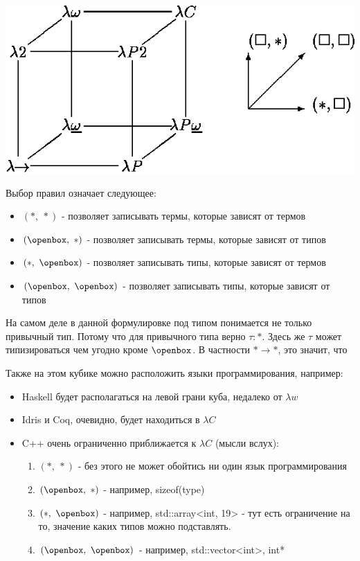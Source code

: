 \begin{center}
    {\includegraphics[scale=0.5]{pic.png}}
\end{center}

Выбор правил означает следующее:
\begin{itemize}
    \item $(*,\ *)$ - позволяет записывать термы, которые зависят от термов
    \item $(\openbox,\ *)$ - позволяет записывать термы, которые зависят от типов
    \item $(*,\ \openbox)$ - позволяет записывать типы, которые зависят от термов
    \item $(\openbox,\ \openbox)$ - позволяет записывать типы, которые зависят от типов
\end{itemize}

На самом деле в данной формулировке под типом понимается не только привычный тип. Потому что для привычного типа верно $\tau : *$. Здесь же $\tau$ может типизироваться чем угодно кроме $\openbox$. В частности $* \rightarrow *$, это значит, что 
    
Также на этом кубике можно расположить языки программирования, например:
\begin{itemize}
    \item Haskell будет располагаться на левой грани куба, недалеко от $\lambda w$
    \item Idris и Coq, очевидно, будет находиться в $\lambda C$
    \item C++ очень ограниченно приближается к $\lambda C$ (мысли вслух):
    \begin{enumerate}
        \item $(*,\ *)$ - без этого не может обойтись ни один язык программирования
        \item $(\openbox,\ *)$ - например, sizeof(type)
        \item $(*,\ \openbox)$ - например, std::array<int, 19> - тут есть ограничение на то, значение каких типов можно подставлять.
        \item $(\openbox,\ \openbox)$ - например, std::vector<int>, int*
    \end{enumerate}
\end{itemize}

